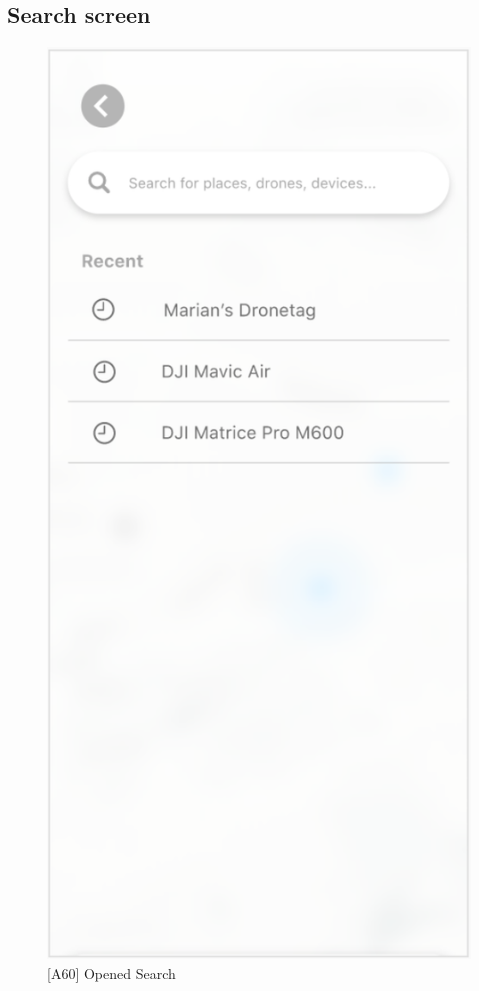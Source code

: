 \subsection{Search screen}\label{subsec:search-screen}


\begin{figure}
    \centering
    \begin{minipage}{.45\textwidth}
        \centering
        \includegraphics[width=.7\linewidth]{assets/user_interface_design/search/opened_search.png}
        \caption{[A60] Opened Search}
        \label{fig:opened_search}
    \end{minipage}%
    \hspace{.05\linewidth}
    \begin{minipage}{.45\textwidth}

\end{minipage}
\end{figure}
